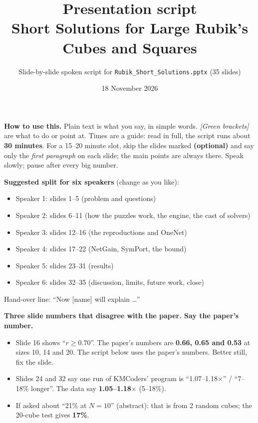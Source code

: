 \documentclass[11pt,a4paper]{article}
\title{\textbf{Presentation script}\\[2pt]\large Short Solutions for Large Rubik's Cubes and Squares}
\author{Slide-by-slide spoken script for \texttt{Rubik\_Short\_Solutions.pptx} (35 slides)}
\date{18 November 2026}
\newcounter{slide}
\begin{document}
\maketitle

\begin{keybox}
\textbf{How to use this.} Plain text is what you say, in simple words. \textcolor{OliveGreen}{\textit{[Green brackets]}} are
what to do or point at. Times are a guide: read in full, the script runs about \textbf{30 minutes}. For a 15--20 minute slot, skip the slides
marked \textbf{(optional)} and say only the \emph{first paragraph} on each slide; the main points are always there. Speak slowly; pause after every big number.
\end{keybox}

\textbf{Suggested split for six speakers} (change as you like):
\begin{itemize}
\item Speaker 1: slides 1--5 (problem and questions)
\item Speaker 2: slides 6--11 (how the puzzles work, the engine, the cast of solvers)
\item Speaker 3: slides 12--16 (the reproductions and OneNet)
\item Speaker 4: slides 17--22 (NetGain, SymPort, the bound)
\item Speaker 5: slides 23--31 (results)
\item Speaker 6: slides 32--35 (discussion, limits, future work, close)
\end{itemize}
Hand-over line: ``Now [name] will explain \ldots''

\begin{warnbox}
\textbf{Three slide numbers that disagree with the paper. Say the paper's number.}
\begin{itemize}
\item Slide 16 shows ``$r\ge0.70$''. The paper's numbers are \textbf{0.66, 0.65 and 0.53} at sizes 10, 14 and 20. The script below
uses the paper's numbers. Better still, fix the slide.
\item Slides 24 and 32 say one run of KMCoders' program is ``1.07--1.18$\times$'' / ``7--18\% longer''. The data say
\textbf{1.05--1.18$\times$} (5--18\%).
\item If asked about ``21\% at $N=10$'' (abstract): that is from 2 random cubes; the 20-cube test gives \textbf{17\%}.
\end{itemize}
\end{warnbox}

\newpage
\end{document}
